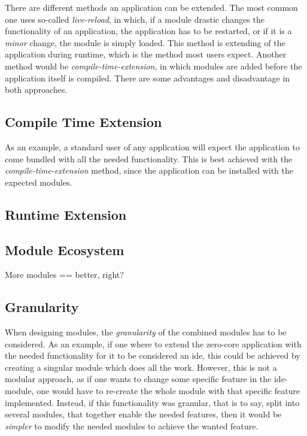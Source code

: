 There are different methods an application can be extended. The most common one
uses so-called \textit{live-reload}, in which, if a module drastic changes the
functionality of an application, the application has to be restarted, or if it
is a \textit{minor} change, the module is simply loaded. This method is
extending of the application during runtime, which is the method most users
expect. Another method would be \textit{compile-time-extension}, in which
modules are added before the application itself is compiled. There are some
advantages and disadvantage in both approaches.

\subsection{Compile Time Extension}

As an example, a standard user of any application will expect the application to
come bundled with all the needed functionality. This is best achieved with the
\textit{compile-time-extension} method, since the application can be installed
with the expected modules.

\subsection{Runtime Extension}



\subsection{Module Ecosystem}

More modules == better, right?

\subsection{Granularity}

When designing modules, the \textit{granularity} of the combined modules has to
be considered. As an example, if one where to extend the zero-core application
with the needed functionality for it to be considered an \gls{ide}, this could be
achieved by creating a singular module which does all the work. However, this
is not a modular approach, as if one wants to change some specific feature in
the \gls{ide}-module, one would have to re-create the whole module with that
specific feature implemented. Instead, if this functionality was granular,
that is to say, split into several modules, that together enable the needed
features, then it would be \textit{simpler} to modify the needed modules to
achieve the wanted feature.


